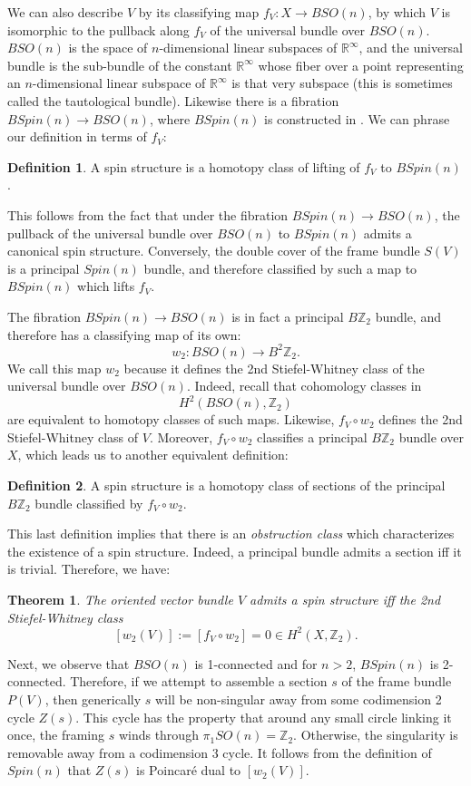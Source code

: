 \documentclass{article}
\def\bZ{\mathbb{Z}}
\def\bR{\mathbb{R}}
\newtheorem{thm}{Theorem}
\theoremstyle{definition}
\newtheorem{defn}{Definition}
\begin{document}
We can also describe $V$ by its classifying map $f_V:X \to BSO(n)$, by which $V$ is isomorphic to the pullback along $f_V$ of the universal bundle over $BSO(n)$. $BSO(n)$ is the space of $n$-dimensional linear subspaces of $\bR^\infty$, and the universal bundle is the sub-bundle of the constant $\bR^\infty$ whose fiber over a point representing an $n$-dimensional linear subspace of $\bR^\infty$ is that very subspace (this is sometimes called the tautological bundle). Likewise there is a fibration $BSpin(n) \to BSO(n)$, where $BSpin(n)$ is constructed in \cite{}. We can phrase our definition in terms of $f_V:$
\begin{defn}
A spin structure is a homotopy class of lifting of $f_V$ to $BSpin(n)$.
\end{defn}
This follows from the fact that under the fibration $BSpin(n) \to BSO(n)$, the pullback of the universal bundle over $BSO(n)$ to $BSpin(n)$ admits a canonical spin structure. Conversely, the double cover of the frame bundle $S(V)$ is a principal $Spin(n)$ bundle, and therefore classified by such a map to $BSpin(n)$ which lifts $f_V$.

The fibration $BSpin(n) \to BSO(n)$ is in fact a principal $B\bZ_2$ bundle, and therefore has a classifying map of its own:
\[w_2:BSO(n) \to B^2 \bZ_2.\]
We call this map $w_2$ because it defines the 2nd Stiefel-Whitney class of the universal bundle over $BSO(n)$. Indeed, recall that cohomology classes in 
\[H^2(BSO(n),\bZ_2)\]
are equivalent to homotopy classes of such maps. Likewise, $f_V \circ w_2$ defines the 2nd Stiefel-Whitney class of $V$. Moreover, $f_V \circ w_2$ classifies a principal $B\bZ_2$ bundle over $X$, which leads us to another equivalent definition:
\begin{defn}
A spin structure is a homotopy class of sections of the principal $B\bZ_2$ bundle classified by $f_V \circ w_2$.
\end{defn}

This last definition implies that there is an \emph{obstruction class} which characterizes the existence of a spin structure. Indeed, a principal bundle admits a section iff it is trivial. Therefore, we have:
\begin{thm}
The oriented vector bundle $V$ admits a spin structure iff the 2nd Stiefel-Whitney class
\[[w_2(V)] := [f_V \circ w_2] = 0 \in H^2(X,\bZ_2).\]
\end{thm}

Next, we observe that $BSO(n)$ is 1-connected and for $n > 2$, $BSpin(n)$ is 2-connected. Therefore, if we attempt to assemble a section $s$ of the frame bundle $P(V)$, then generically $s$ will be non-singular away from some codimension 2 cycle $Z(s)$. This cycle has the property that around any small circle linking it once, the framing $s$ winds through $\pi_1 SO(n) = \bZ_2$. Otherwise, the singularity is removable away from a codimension 3 cycle. It follows from the definition of $Spin(n)$ that $Z(s)$ is Poincar\'e dual to $[w_2(V)]$.
\end{document}
